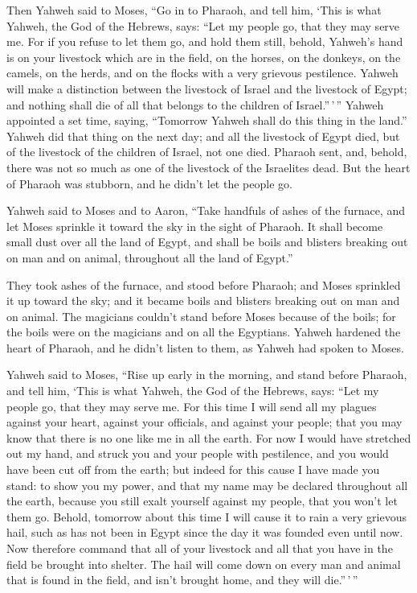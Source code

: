  Then Yahweh said to Moses, ``Go in to Pharaoh, and tell
him, `This is what Yahweh, the God of the Hebrews, says: ``Let my people
go, that they may serve me.  For if you refuse to let them
go, and hold them still,  behold, Yahweh's hand is on your
livestock which are in the field, on the horses, on the donkeys, on the
camels, on the herds, and on the flocks with a very grievous pestilence.
 Yahweh will make a distinction between the livestock of
Israel and the livestock of Egypt; and nothing shall die of all that
belongs to the children of Israel.''\,'\,''  Yahweh
appointed a set time, saying, ``Tomorrow Yahweh shall do this thing in
the land.''  Yahweh did that thing on the next day; and all
the livestock of Egypt died, but of the livestock of the children of
Israel, not one died.  Pharaoh sent, and, behold, there was
not so much as one of the livestock of the Israelites dead. But the
heart of Pharaoh was stubborn, and he didn't let the people go.

 Yahweh said to Moses and to Aaron, ``Take handfuls of ashes
of the furnace, and let Moses sprinkle it toward the sky in the sight of
Pharaoh.  It shall become small dust over all the land of
Egypt, and shall be boils and blisters breaking out on man and on
animal, throughout all the land of Egypt.''

 They took ashes of the furnace, and stood before Pharaoh;
and Moses sprinkled it up toward the sky; and it became boils and
blisters breaking out on man and on animal.  The magicians
couldn't stand before Moses because of the boils; for the boils were on
the magicians and on all the Egyptians.  Yahweh hardened
the heart of Pharaoh, and he didn't listen to them, as Yahweh had spoken
to Moses.

 Yahweh said to Moses, ``Rise up early in the morning, and
stand before Pharaoh, and tell him, `This is what Yahweh, the God of the
Hebrews, says: ``Let my people go, that they may serve me. 
For this time I will send all my plagues against your heart, against
your officials, and against your people; that you may know that there is
no one like me in all the earth.  For now I would have
stretched out my hand, and struck you and your people with pestilence,
and you would have been cut off from the earth;  but indeed
for this cause I have made you stand: to show you my power, and that my
name may be declared throughout all the earth,  because you
still exalt yourself against my people, that you won't let them go.
 Behold, tomorrow about this time I will cause it to rain a
very grievous hail, such as has not been in Egypt since the day it was
founded even until now.  Now therefore command that all of
your livestock and all that you have in the field be brought into
shelter. The hail will come down on every man and animal that is found
in the field, and isn't brought home, and they will die.''\,'\,''

